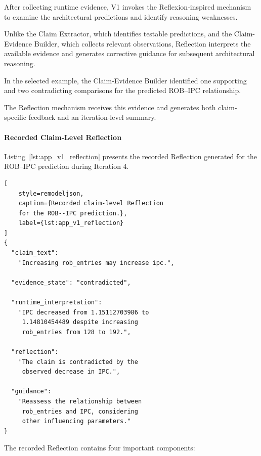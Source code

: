 After collecting runtime evidence, V1 invokes
the Reflexion-inspired mechanism to examine
the architectural predictions and identify
reasoning weaknesses.

Unlike the Claim Extractor, which identifies
testable predictions, and the Claim-Evidence
Builder, which collects relevant observations,
Reflection interprets the available evidence
and generates corrective guidance for
subsequent architectural reasoning.

In the selected example, the Claim-Evidence
Builder identified one supporting and two
contradicting comparisons for the predicted
ROB--IPC relationship.

The Reflection mechanism receives this
evidence and generates both claim-specific
feedback and an iteration-level summary.

\paragraph{Recorded Claim-Level Reflection}

Listing~\ref{lst:app_v1_reflection}
presents the recorded Reflection generated
for the ROB--IPC prediction during
Iteration 4.

\begin{lstlisting}[
    style=remodeljson,
    caption={Recorded claim-level Reflection
    for the ROB--IPC prediction.},
    label={lst:app_v1_reflection}
]
{
  "claim_text":
    "Increasing rob_entries may increase ipc.",

  "evidence_state": "contradicted",

  "runtime_interpretation":
    "IPC decreased from 1.15112703986 to
     1.14810454489 despite increasing
     rob_entries from 128 to 192.",

  "reflection":
    "The claim is contradicted by the
     observed decrease in IPC.",

  "guidance":
    "Reassess the relationship between
     rob_entries and IPC, considering
     other influencing parameters."
}
\end{lstlisting}

The recorded Reflection contains four
important components:

